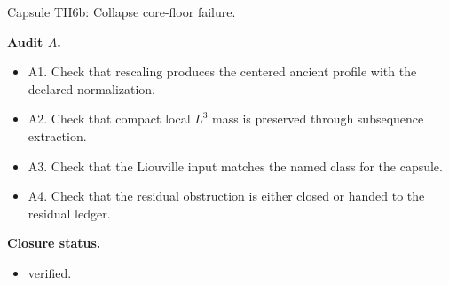 \documentclass[11pt]{amsart}
\newcommand{\capsulefield}[1]{\par\smallskip\noindent\textbf{#1.}\ }
\begin{document}
\begin{proofcapsule}{Capsule TII6b: Collapse core-floor failure.}
  \capsulefield{Audit \(A\)}
  \begin{itemize}[leftmargin=1.8em]
  \item A1. Check that rescaling produces the centered ancient profile with the declared normalization.
  \item A2. Check that compact local $L^3$ mass is preserved through subsequence extraction.
  \item A3. Check that the Liouville input matches the named class for the capsule.
  \item A4. Check that the residual obstruction is either closed or handed to the residual ledger.
  \end{itemize}
  \capsulefield{Closure status}
  \begin{itemize}[leftmargin=1.8em]
  \item verified.
  \end{itemize}
\end{proofcapsule}
\end{document}
